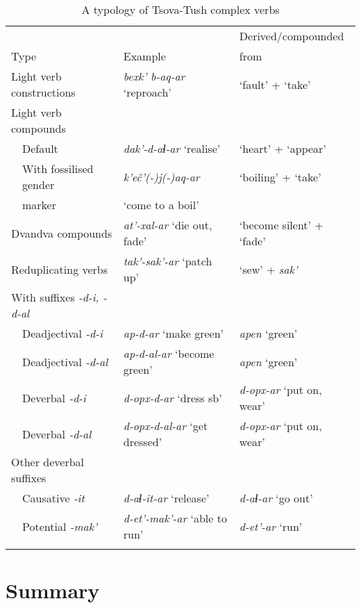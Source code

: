 \begin{table}[hp]
	\small
	\begin{tabular}{llll}
    \lsptoprule
                       &           &           & Derived/compounded\\
		\multicolumn{2}{l}{{Type}} & {Example} & {from} \\
        \midrule
		\multicolumn{2}{l}{Light verb constructions} & \textit{bexk' b-aq-ar} `reproach' & `fault' + `take' \\
		\multicolumn{2}{l}{Light verb compounds}  & & \\
		& Default & \textit{dak'-d-aɬ-ar} `realise' & `heart' + `appear' \\
		& With fossilised gender  & \textit{k'eč'(-)j(-)aq-ar}  & `boiling' + `take' \\
		& \quad marker            & \quad  `come to a boil'  & \\
		\multicolumn{2}{l}{Dvandva compounds} & \textit{at'-xal-ar} `die out, fade' & `become silent' + `fade' \\
		\multicolumn{2}{l}{Reduplicating verbs} & \textit{tak'-sak'-ar} `patch up' & `sew' + \textit{sak'} \\
		\multicolumn{2}{l}{With suffixes \textit{-d-i, -d-al}} \\
		& Deadjectival \textit{-d-i} & \textit{ap-d-ar} `make green' & \textit{apen} `green' \\
		& Deadjectival \textit{-d-al} & \textit{ap-d-al-ar} `become green' & \textit{apen} `green' \\
		& Deverbal \textit{-d-i} & \textit{d-opx-d-ar} `dress sb' & \textit{d-opx-ar} `put on, wear' \\
		& Deverbal \textit{-d-al} & \textit{d-opx-d-al-ar} `get dressed' & \textit{d-opx-ar} `put on, wear' \\
		\multicolumn{2}{l}{Other deverbal suffixes} \\
		& Causative \textit{-it} & \textit{d-aɬ-it-ar} `release' & \textit{d-aɬ-ar} `go out' \\
		& Potential \textit{-mak'} & \textit{d-et'-mak'-ar} `able to run' & \textit{d-et'-ar} `run' \\
		
		\lspbottomrule
	\end{tabular}
	\caption{A typology of Tsova-Tush complex verbs}
	\label{table-complexverbtyp}
\end{table}

\pagebreak
\section{Summary}


